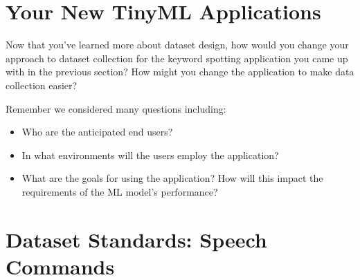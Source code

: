 \section{Your New TinyML Applications}

Now that you’ve learned more about dataset design, how would you change your approach to dataset collection for the keyword spotting application you came up with in the previous section? How might you change the application to make data collection easier?

Remember we considered many questions including:

\begin{itemize}
  \item Who are the anticipated end users?
  \item In what environments will the users employ the application?
  \item What are the goals for using the application? How will this impact the requirements of the ML model's performance?
\end{itemize}


\section{Dataset Standards: Speech Commands}

